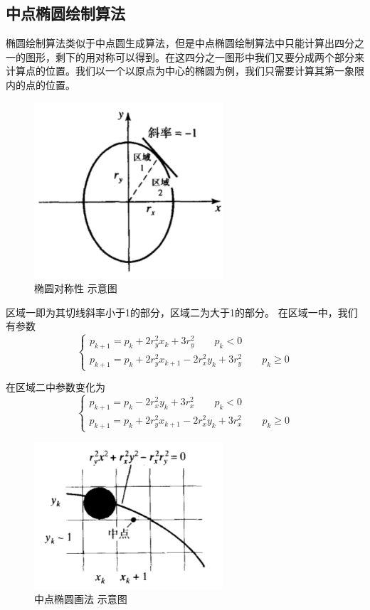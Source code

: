 \documentclass[a4paper,UTF8]{article}
\theoremstyle{definition}
\begin{document}
\subsection{中点椭圆绘制算法}
椭圆绘制算法类似于中点圆生成算法，但是中点椭圆绘制算法中只能计算出四分之一的图形，剩下的用对称可以得到。在这四分之一图形中我们又要分成两个部分来计算点的位置。我们以一个以原点为中心的椭圆为例，我们只需要计算其第一象限内的点的位置。
\begin{figure}[ht]
\centering
\includegraphics[width=7cm]{x4.png}
\caption{椭圆对称性 示意图}
\label{x4}
\end{figure}
区域一即为其切线斜率小于1的部分，区域二为大于1的部分。
在区域一中，我们有参数
\begin{equation}
\left\{
\begin{aligned}
p_{k+1}=p_{k}+2r_{y}^2 x_{k}+3 r_{y}^2 \qquad p_{k}<0\\
p_{k+1}=p_{k}+2r_{y}^2x_{k+1}-2r_{x}^2 y_{k}+3 r_{y}^2 \qquad p_{k}\geq 0
\end{aligned}
\right.
\end{equation}
\par 在区域二中参数变化为
\begin{equation}
\left\{
\begin{aligned}
p_{k+1}=p_{k}-2r_{x}^2 y_{k}+3 r_{x}^2 \qquad p_{k}<0\\
p_{k+1}=p_{k}+2r_{y}^2x_{k+1}-2r_{x}^2 y_{k}+3 r_{x}^2 \qquad p_{k}\geq 0
\end{aligned}
\right.
\end{equation}
\begin{figure}[ht]
\centering
\includegraphics[width=7cm]{x5.png}
\caption{中点椭圆画法 示意图}
\label{x5}
\end{figure}
\end{document}
